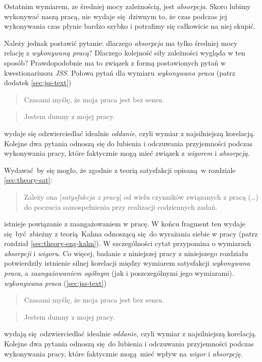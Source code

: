 Ostatnim wymiarem, ze średniej mocy zależnością, jest \textit{absorpcja}. Skoro lubimy wykonywać naszą pracą, nie wydaje się dziwnym to, że czas podczas jej wykonywania czas płynie bardzo szybko i potrafimy się całkowicie na niej skupić. 

Należy jednak postawić pytanie: dlaczego \textit{absorpcja} ma tylko średniej mocy relację z \textit{wykonywaną pracą}? Dlaczego kolejność siły zależności wygląda w ten sposób? Prawdopodobnie ma to związek z formą postawionych pytań w kwestionariuszu \emph{JSS}. Połowa pytań dla wymiaru \textit{wykonywana praca} (patrz dodatek \ref{sec:jss-text})
\begin{quote}
  Czasami myślę, że moja praca jest bez sensu.
\end{quote}
\begin{quote}
  Jestem dumny z mojej pracy.
\end{quote}
wydaje się odzwierciedlać idealnie \textit{oddanie}, czyli wymiar z najsilniejszą korelacją. Kolejne dwa pytania odnoszą się do lubienia i odczuwania przyjemności podczas wykonywania pracy, które faktycznie mogą mieć związek z \textit{wigorem} i \textit{absorpcją}.


Wydawać by się mogło, że zgodnie z teorią satysfakcji \citep{SchultzSat} opisaną w rozdziale \ref{sec:theory-sat}:

\begin{quote}
  Zależy ona [\textit{satysfakcja z pracy}] od wielu czynników związanych z pracą (\ldots) do poczucia samospełnienia przy realizacji codziennych zadań.
\end{quote}

istnieje powiązanie z zaangażowaniem w pracę. W końcu fragment ten wydaje się być zbieżny z teorią Kahna odnoszącą się do wyrażania siebie w pracy (patrz rozdział \ref{sec:theory-eng-kahn}). W szczególności cytat przypomina o wymiarach \textit{absorpcji} i \textit{wigoru}. Co więcej, badanie z niniejszej pracy z niniejszego rozdziału potwierdziły istnienie silnej korelacji między wymiarem satysfakcji \textit{wykonywana praca}, a \emph{zaangażowaniem ogólnym} (jak i poszczególnymi jego wymiarami).
\textit{wykonywana praca} (\ref{sec:jss-text})
\begin{quote}
  Czasami myślę, że moja praca jest bez sensu.
\end{quote}
\begin{quote}
  Jestem dumny z mojej pracy.
\end{quote}
wydają się odzwierciedlać idealnie \textit{oddanie}, czyli wymiar z najsilniejszą korelacją. Kolejne dwa pytania odnoszą się do lubienia i odczuwania przyjemności podczas wykonywania pracy, które faktycznie mogą mieć wpływ na \textit{wigor} i \textit{absorpcję}.

